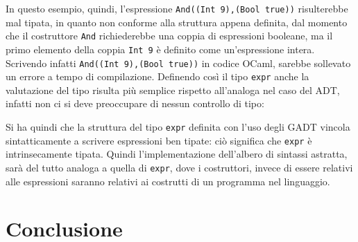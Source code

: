 \documentclass[12pt,a4paper]{report}
\begin{document}
\begin{Shaded}
\begin{Highlighting}[]
\NormalTok{ -> }
\NormalTok{ -> }
\end{Highlighting}
\end{Shaded}

In questo esempio, quindi, l'espressione
\texttt{And((Int\ 9),(Bool\ true))} risulterebbe mal tipata, in quanto
non conforme alla struttura appena definita, dal momento che il
costruttore \texttt{And} richiederebbe una coppia di espressioni
booleane, ma il primo elemento della coppia \texttt{Int\ 9} è definito
come un'espressione intera. Scrivendo infatti
\texttt{And((Int\ 9),(Bool\ true))} in codice OCaml, sarebbe sollevato
un errore a tempo di compilazione. Definendo così il tipo \texttt{expr}
anche la valutazione del tipo risulta più semplice rispetto all'analoga
nel caso del ADT, infatti non ci si deve preoccupare di nessun controllo
di tipo:

\begin{Shaded}
\begin{Highlighting}[]
 
\end{Highlighting}
\end{Shaded}

Si ha quindi che la struttura del tipo \texttt{expr} definita con l'uso
degli GADT vincola sintatticamente a scrivere espressioni ben tipate:
ciò significa che \texttt{expr} è intrinsecamente tipata. Quindi
l'implementazione dell'albero di sintassi astratta, sarà del tutto
analoga a quella di \texttt{expr}, dove i costruttori, invece di essere
relativi alle espressioni saranno relativi ai costrutti di un programma
nel linguaggio.

\hypertarget{conclusione}{%
\section{Conclusione}\label{conclusione}}
\end{document}
